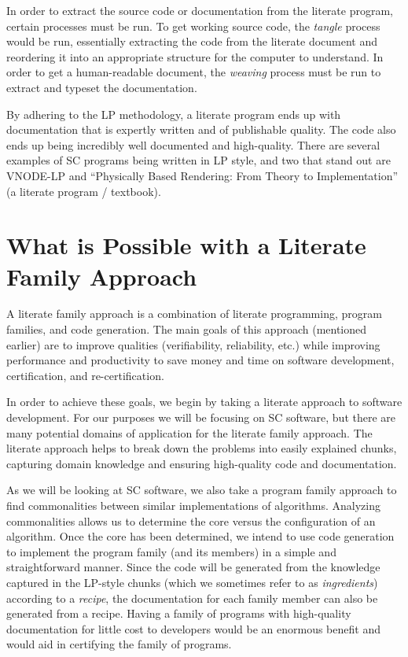 \documentclass[10pt, preprint]{sigplanconf}
\begin{document}
In order to extract the source code or documentation from the literate program, certain processes must be run. To get working source code, the \textit{tangle} process would be run, essentially extracting the code from the literate document and reordering it into an appropriate structure for the computer to understand. In order to get a human-readable document, the \textit{weaving} process must be run to extract and typeset the documentation. 

By adhering to the LP methodology, a literate program ends up with documentation that is expertly written and of publishable quality. The code also ends up being incredibly well documented and high-quality. There are several examples of SC programs being written in LP style, and two that stand out are VNODE-LP \cite{Nedialkov2006} and ``Physically Based Rendering: From Theory to Implementation'' \cite{PharrHumphreys2004} (a literate program / textbook). 

\section{What is Possible with a Literate Family Approach}
\label{sec:what}

A literate family approach is a combination of literate programming, program families, and code generation. The main goals of this approach (mentioned earlier) are to improve qualities (verifiability, reliability, etc.) while improving performance and productivity to save money and time on software development, certification, and re-certification.

In order to achieve these goals, we begin by taking a literate approach to software development. For our purposes we will be focusing on SC software, but there are many potential domains of application for the literate family approach. The literate approach helps to break down the problems into easily explained chunks, capturing domain knowledge and ensuring high-quality code and documentation.

As we will be looking at SC software, we also take a program family approach to find commonalities between similar implementations of algorithms. Analyzing commonalities allows us to determine the core versus the configuration of an algorithm. Once the core has been determined, we intend to use code generation to implement the program family (and its members) in a simple and straightforward manner. Since the code will be generated from the knowledge captured in the LP-style chunks (which we sometimes refer to as \textit{ingredients}) according to a \textit{recipe}, the documentation for each family member can also be generated from a recipe. %
Having a family of programs with high-quality documentation for little cost to developers would be an enormous benefit and would aid in certifying the family of programs.
\end{document}
